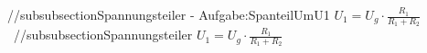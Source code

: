 //subsubsection{Spannungsteiler - Aufgabe:SpanteilUmU1} 
$ U_{1}  = U_{g} \cdot \frac{ R_{1} }{R_{1} +R_{2} } $\ 
//subsubsection{Spannungsteiler} 
$ U_{1}  = U_{g} \cdot \frac{ R_{1} }{R_{1} +R_{2} } $\ 
